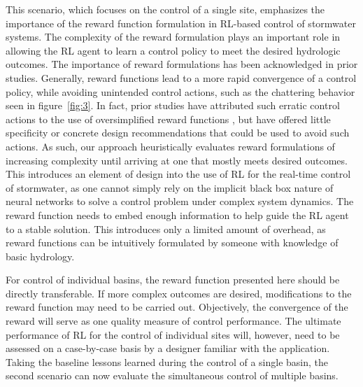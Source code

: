 
This scenario, which focuses on the control of a single site, emphasizes the importance of the reward function formulation in RL-based control of stormwater systems.
The complexity of the reward formulation plays an important role in allowing the RL agent to learn a control policy to meet the desired hydrologic outcomes.
The importance of reward formulations has been acknowledged in prior studies\cite{Sutton98, ng1999policy}.
Generally,  reward functions  lead to a more rapid convergence of a control policy, while avoiding unintended control actions, such as the chattering behavior seen in figure~\ref{fig:3}.
In fact, prior studies have attributed such erratic control actions to the use of oversimplified reward functions \cite{ng1999policy}, but have offered little specificity or concrete design recommendations that could be used to avoid such actions.
As such, our approach heuristically evaluates reward formulations of increasing complexity until arriving at one that mostly meets desired outcomes.
This introduces an element of design into the use of RL for the real-time control of stormwater, as one cannot simply rely on the implicit black box nature of neural networks to solve a control problem under complex system dynamics.
The reward function needs to embed enough information to help guide the RL agent to a stable solution.
This introduces only a limited amount of overhead, as reward functions can be intuitively formulated by someone with knowledge of basic hydrology.

For control of individual basins, the reward function presented here should be directly transferable.
If more complex outcomes are desired, modifications to the reward function may need to be carried out.
Objectively, the convergence of the reward will serve as one quality measure of control performance.
The ultimate performance of RL for the control of individual sites will, however, need to be assessed on a case-by-case basis by a designer familiar with the application.
Taking the baseline lessons learned during the control of a single basin, the second scenario can now evaluate the simultaneous control of multiple basins.

